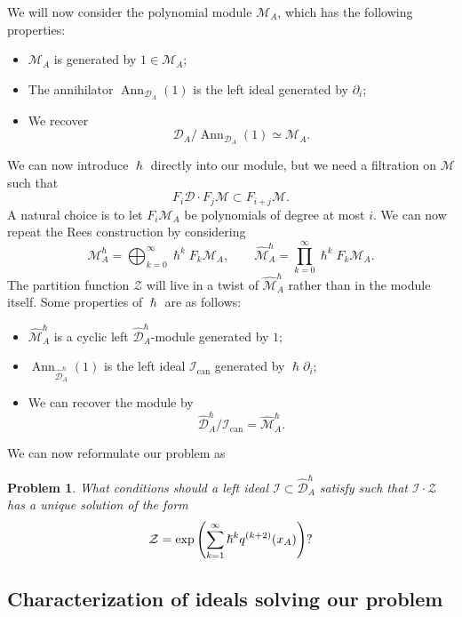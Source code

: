 \documentclass{amsart}
\newtheorem{prob}[thm]{Problem}
\theoremstyle{definition}
\theoremstyle{remark}
\theoremstyle{plain}
\theoremstyle{definition}
\theoremstyle{remark}
\newcommand{\mc}[1]{\mathcal{#1}}
\newcommand{\mr}[1]{\mathrm{#1}}
\newcommand{\on}[1]{\operatorname{#1}}
\newcommand{\wh}[1]{\widehat{#1}}
\newcommand{\1}{\mathbf{1}}
\newcommand{\2}{\mathbf{2}}
\newcommand{\3}{\mathbf{3}}
\begin{document}
We will now consider the polynomial module $\mc{M}_A$, which has the following properties: 
\begin{itemize}
    \item $\mc{M}_A$ is generated by $1 \in \mc{M}_A$; 
    \item The annihilator $\on{Ann}_{\mc{D}_A}(1)$ is the left ideal generated by $\partial_i$; 
    \item We recover 
        \[ \mc{D}_A / \on{Ann}_{\mc{D}_A}(1) \simeq \mc{M}_A. \]
\end{itemize}
We can now introduce $\hslash$ directly into our module, but we need a filtration on $\mc{M}$ such that
\[ F_i \mc{D} \cdot F_j \mc{M} \subset F_{i+j} \mc{M}. \]
A natural choice is to let $F_i \mc{M}_A$ be polynomials of degree at most $i$. We can now repeat the Rees construction by considering
\[ \mc{M}_A^{\hslash} = \bigoplus_{k=0}^{\infty} \hslash^k F_k \mc{M}_A, \qquad \wh{\mc{M}}_A^{\hslash} = \prod_{k=0}^{\infty} \hslash^k F_k \mc{M}_A. \]
The partition function $\mc{Z}$ will live in a twist of $\wh{\mc{M}}_A^{\hslash}$ rather than in the module itself. Some properties of $\hslash$ are as follows:
\begin{itemize}
    \item $\wh{\mc{M}}_A^{\hslash}$ is a cyclic left $\wh{\mc{D}}_A^{\hslash}$-module generated by $1$;
    \item $\on{Ann}_{\wh{\mc{D}}_A^{\hslash}}(1)$ is the left ideal $\mc{I}_{\mr{can}}$ generated by $\hslash \partial_i$;
    \item We can recover the module by
        \[ \wh{\mc{D}}_A^{\hslash}/\mc{I}_{\mr{can}} = \wh{\mc{M}}_A^{\hslash}. \]
\end{itemize}

We can now reformulate our problem as
\begin{prob}
    What conditions should a left ideal $\mc{I} \subset \wh{\mc{D}}_A^{\hslash}$ satisfy such that $\mc{I} \cdot \mc{Z}$ has a unique solution of the form
    \begin{equation}\label{eqn:desiredsoln}
        \mc{Z} = \exp\qty(\sum_{k=1}^{\infty} \hslash^k q^{(k+2)}(x_A))? 
    \end{equation}
\end{prob}

\subsection{Characterization of ideals solving our problem}
\end{document}
